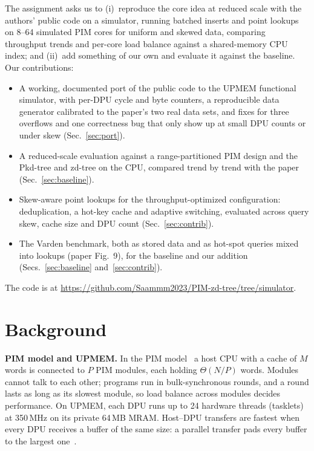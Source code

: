 \documentclass[conference]{IEEEtran}
\newcommand{\codeurl}{\url{https://github.com/Saammm2023/PIM-zd-tree/tree/simulator}}
\begin{document}
The assignment asks us to (i)~reproduce the core idea at reduced scale with the authors' public code on a simulator,
running batched inserts and point lookups on 8--64 simulated PIM cores for uniform and skewed data, comparing
throughput trends and per-core load balance against a shared-memory CPU index; and (ii)~add something of our own and
evaluate it against the baseline. Our contributions:
\begin{itemize}
  \item A working, documented port of the public code to the UPMEM functional simulator, with per-DPU cycle and byte
        counters, a reproducible data generator calibrated to the paper's two real data sets, and fixes for three
        overflows and one correctness bug that only show up at small DPU counts or under skew (Sec.~\ref{sec:port}).
  \item A reduced-scale evaluation against a range-partitioned PIM design and the Pkd-tree and zd-tree on the CPU,
        compared trend by trend with the paper (Sec.~\ref{sec:baseline}).
  \item Skew-aware point lookups for the throughput-optimized configuration: deduplication, a hot-key cache and
        adaptive switching, evaluated across query skew, cache size and DPU count (Sec.~\ref{sec:contrib}).
  \item The Varden benchmark, both as stored data and as hot-spot queries mixed into lookups (paper Fig.~9), for the
        baseline and our addition (Secs.~\ref{sec:baseline} and~\ref{sec:contrib}).
\end{itemize}
The code is at \codeurl.

\section{Background}

\textbf{PIM model and UPMEM.} In the PIM model~\cite{pimmodel} a host CPU with a cache of $M$ words is connected to
$P$ PIM modules, each holding $\Theta(N/P)$ words. Modules cannot talk to each other; programs run in bulk-synchronous
rounds, and a round lasts as long as its slowest module, so load balance across modules decides performance. On UPMEM,
each DPU runs up to 24 hardware threads (tasklets) at 350\,MHz on its private 64\,MB MRAM. Host--DPU transfers are
fastest when every DPU receives a buffer of the same size: a parallel transfer pads every buffer to the largest
one~\cite{prim}.
\end{document}
